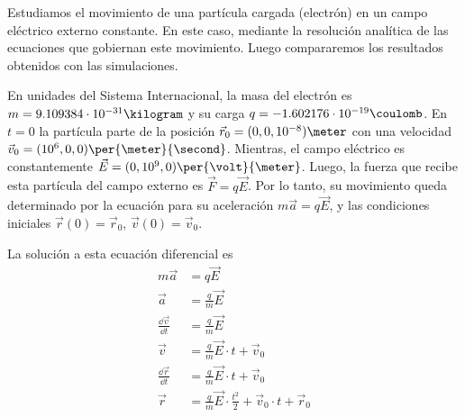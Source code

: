 \documentclass{article}
\begin{document}
  Estudiamos el movimiento de una partícula cargada (electrón) en un campo eléctrico externo constante.
  En este caso, mediante la resolución analítica de las ecuaciones que gobiernan este movimiento.
  Luego compararemos los resultados obtenidos con las simulaciones.

  En unidades del Sistema Internacional, la masa del electrón es \(m = 9.109384 \cdot 10^{-31} \kilogram\) y su carga \(q = -1.602176 \cdot 10^{-19} \coulomb\).
  En \(t = 0\) la partícula parte de la posición \(\vec{r}_0 = (0, 0, 10^{- 8}) \meter\) con una velocidad \(\vec{v}_0 = (10^6, 0, 0) \per{\meter}{\second}\).
  Mientras, el campo eléctrico es constantemente \(\vec{E} = (0, 10^9, 0) \per{\volt}{\meter}\).
  Luego, la fuerza que recibe esta partícula del campo externo es \(\vec{F} = q \vec{E}\).
  Por lo tanto, su movimiento queda determinado por la ecuación para su aceleración \(m \vec{a} = q \vec{E}\), y las condiciones iniciales \(\vec{r}(0) = \vec{r}_0\), \(\vec{v}(0) = \vec{v}_0\).

  La solución a esta ecuación diferencial es
  \begin{align}
    m \vec{a}
      &=
      q \vec{E}
    \\
    \vec{a}
      &=
      \frac{q}{m} \vec{E}
    \\
    \frac{\dd \vec{v}}{\dd t}
      &=
      \frac{q}{m} \vec{E}
    \\
    \vec{v}
      &=
      \frac{q}{m} \vec{E} \cdot t + \vec{v}_0
    \\
    \frac{\dd \vec{r}}{\dd t}
      &=
      \frac{q}{m} \vec{E} \cdot t + \vec{v}_0
    \\
    \vec{r}
      &=
      \frac{q}{m} \vec{E} \cdot \frac{t^2}{2} + \vec{v}_0 \cdot t + \vec{r}_0
  \end{align}
\end{document}
